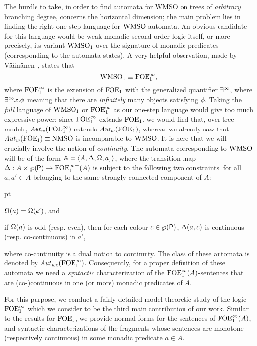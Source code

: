 The hurdle to take, in order to find automata for WMSO on trees of
\emph{arbitrary} branching degree, concerns the horizontal dimension; the
main problem lies in finding the right one-step language for
$\mathrm{WMSO}$-automata.
An obvious candidate for this language would be weak monadic second-order logic
itself, or more precisely, its variant $\mathrm{WMSO}_1$ over the signature of monadic
predicates (corresponding to the automata states).
A very helpful observation, made by V\"a\"an\"anen~\cite{vaananen77}, states that
\[
\mathrm{WMSO}_1 \equiv \mathrm{FOE}^{\infty}_1,
\]
where $\mathrm{FOE}^{\infty}_1$ is the extension of $\mathrm{FOE}_1$ with the generalized quantifier
$\exists^\infty$, where $\exists^\infty x. \phi$ meaning that there are \emph{infinitely} many
objects satisfying $\phi$.
Taking the \emph{full} language of $\mathrm{WMSO}_1$ or $\mathrm{FOE}^{\infty}_1$ as our one-step language
would give too much expressive power: since $\mathrm{FOE}^{\infty}_1$ extends $\mathrm{FOE}_1$,
we would find that, over tree models, $\mathit{Aut}_{w}(\mathrm{FOE}^{\infty}_1)$ extends
$\mathit{Aut}_{w}(\mathrm{FOE}_1)$, whereas we already saw that $\mathit{Aut}_{w}(\mathrm{FOE}_1) \equiv
\mathrm{NMSO}$ is incomparable to $\mathrm{WMSO}$.
%
It is here that we will crucially involve the notion of \emph{continuity}.
The automata corresponding to $\mathrm{WMSO}$ will be of the form $\mathbb{A} = \langle{A, \Delta, \Omega, a_I}\rangle$,
where the transition map $\Delta: A \times \wp(\mathsf{P}) \to
{\ensuremath{\mathrm{FOE}^{\infty}_1}}^+(A)$ is subject to the following two constraints, for all $a,a' \in A$
belonging to the same strongly connected component of $A$:
\begin{description}
 pt
\item[(weakness)] $\Omega(a) = \Omega(a')$, and
\item[(continuity)]
if $\Omega(a)$ is odd (resp. even), then for each colour $c\in \wp(\mathsf{P})$,
   $\Delta(a,c)$ is continuous (resp. co-continuous) in $a'$,
\end{description}
where co-continuity is a dual notion to continuity.
The class of these automata is denoted by $\mathit{Aut}_{wc}(\mathrm{FOE}^{\infty}_1)$.
%
Consequently, for a proper definition of these automata we need a
\emph{syntactic} characterization of the $\mathrm{FOE}^{\infty}_1(A)$-sentences that are
(co-)continuous in one (or more) monadic predicates of $A$.

For this purpose, we conduct a fairly detailed model-theoretic study of the
logic $\mathrm{FOE}^{\infty}_1$ which we consider to be the third main
contribution of our work.
Similar to the results for $\mathrm{FOE}_1$, we provide normal forms for the
sentences of $\mathrm{FOE}^{\infty}_1(A)$, and syntactic characterizations of the fragments
whose sentences are monotone (respectively continuous) in some monadic predicate $a \in A$.


